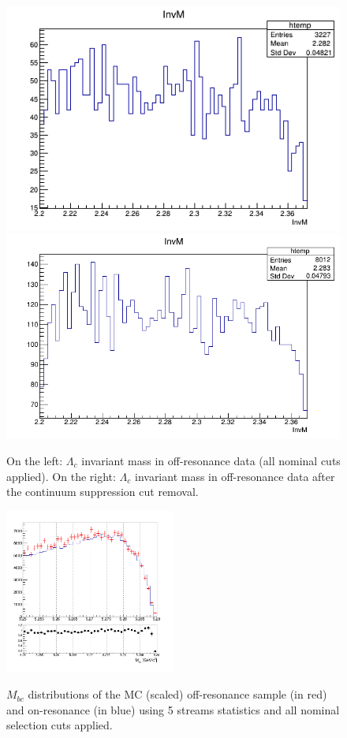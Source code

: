 \begin{figure}
\centering
\subcaptionbox{\label{fig:off-resData_charged_corrLambdaC_InvM}}
{\includegraphics[width=.45\textwidth]{04-SimultaneousFit/figs/chargedCorrLambdaC_off-resData.png}}\quad
\subcaptionbox{\label{fig:off-resData_charged_corrLambdaC_InvM_woCS}}
{\includegraphics[width=.48\textwidth]{04-SimultaneousFit/figs/chargedCorrLambdaC_off-resData_woCScuts.png}} \quad
\caption{On the left: $\Lambda_c$ invariant mass in off-resonance data (all nominal cuts applied). On the right: $\Lambda_c$ invariant mass in off-resonance data after the continuum suppression cut removal.}
\end{figure}


\begin{figure}[H]
{\includegraphics[width=0.5\textwidth]{04-SimultaneousFit/figs/stream01234_Mbc_continuumRescaling.png}}
\caption{$M_{bc}$ distributions of the MC (scaled) off-resonance sample (in red) and on-resonance (in blue) using 5 streams statistics and all nominal selection cuts applied.}
\label{fig:charged_corrLambdaC_Mbc_on_offResScaled}
\end{figure}

